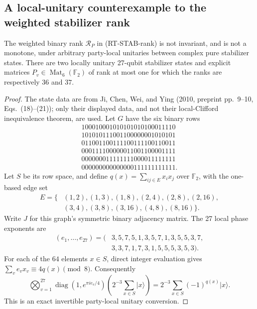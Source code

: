 \subsection{A local-unitary counterexample to the weighted stabilizer rank}
\label{rt:lu-rank-counterexample}

\begin{proposition}\label{rt:lu-rank-failure}
The weighted binary rank $\mathcal R_P$ in (RT-STAB-rank) is not
invariant, and is not a monotone, under arbitrary party-local unitaries
between complex pure stabilizer states. There are two locally unitary
27-qubit stabilizer states and explicit matrices $P_v\in
\operatorname{Mat}_6(\mathbb F_2)$ of rank at most one for which the
ranks are respectively $36$ and $37$.
\end{proposition}
\begin{proof}
The state data are from Ji, Chen, Wei, and Ying (2010, preprint
pp.~9--10, Eqs.~(18)--(21)); only their displayed data, and not their
local-Clifford inequivalence theorem, are used. Let $G$ have the six
binary rows
\[
\begin{array}{l}
100010001010101010100011110\\
101010111001100000001010101\\
011001100111100111100110011\\
000111100000011001100001111\\
000000011111111000011111111\\
000000000000000111111111111.
\end{array}
\]
Let $S$ be its row space, and define $q(x)=\sum_{ij\in E}x_ix_j$
over $\mathbb F_2$, with the one-based edge set
\[
\begin{split}
 E=\{&(1,2),(1,3),(1,8),(2,4),(2,8),(2,16),\\
     &(3,4),(3,8),(3,16),(4,8),(8,16)\}.
\end{split}
\]
Write $J$ for this graph's symmetric binary adjacency matrix. The
27 local phase exponents are
\[
\begin{split}
(e_1,\ldots,e_{27})=(&3,5,7,5,1,3,5,7,1,3,5,5,3,7,\\
                  &3,3,7,1,7,3,1,5,5,5,3,5,3).
\end{split}
\]
For each of the $64$ elements $x\in S$, direct integer evaluation gives
$\sum_v e_vx_v\equiv4q(x)\pmod8$. Consequently
\[
 \bigotimes_{v=1}^{27}\operatorname{diag}(1,e^{\pi i e_v/4})
 \left(2^{-3}\sum_{x\in S}|x\rangle\right)
 =2^{-3}\sum_{x\in S}(-1)^{q(x)}|x\rangle.
 \tag{RT-LU-phase}
\]
This is an exact invertible party-local unitary conversion.


\end{proof}
